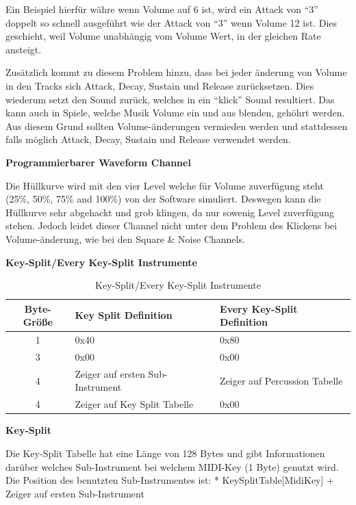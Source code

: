 \documentclass[11pt,a4paper]{scrartcl}
\newcommand{\paratitle}[1] {
    \vspace{5mm}
    \large \textbf{#1} \normalsize
    \vspace{2mm}\newline
}
\begin{document}
Ein Beispiel hierf\"ur w\"ahre wenn Volume auf 6 ist, wird ein Attack von \enquote{3} doppelt so schnell ausgef\"uhrt wie der Attack von \enquote{3} wenn Volume 12 ist. Dies geschieht, weil Volume unabh\"angig vom Volume Wert, in der gleichen Rate ansteigt.

Zus\"atzlich kommt zu diesem Problem hinzu, dass bei jeder \"anderung von Volume in den Tracks sich Attack, Decay, Sustain und Release zur\"ucksetzen. Dies wiederum setzt den Sound zur\"uck, welches in ein \enquote{klick} Sound resultiert. Das kann auch in Spiele, welche Musik Volume ein und aus blenden, geh\"ohrt werden. Aus diesem Grund sollten Volume-\"anderungen vermieden werden und stattdessen falls m\"oglich Attack, Decay, Sustain und Release verwendet werden.

\paratitle{Programmierbarer Waveform Channel}
Die H\"ullkurve wird mit den vier Level welche f\"ur Volume zuverf\"ugung steht (25\%, 50\%, 75\% and 100\%) von der Software simuliert. Deswegen kann die H\"ullkurve sehr abgehackt und grob klingen, da nur sowenig Level zuverf\"ugung stehen. Jedoch leidet dieser Channel nicht unter dem Problem des Klickens bei Volume-\"anderung, wie bei den Square \& Noise Channels.



\newpage
\paratitle{Key-Split/Every Key-Split Instrumente}

\begin{table}[h]
    \centering
    \begin{tabular}{ c | p{} | p{}}
        \textbf{Byte-Gr\"o{\ss}e} & \textbf{Key Split Definition} & \textbf{Every Key-Split Definition}\\
        \hline
        1 & 0x40 & 0x80\\
				\hline
        3 & 0x00 & 0x00\\
				\hline
        4 & Zeiger auf ersten Sub-Instrument & Zeiger auf Percussion Tabelle \\
				\hline
        4 & Zeiger auf Key Split Tabelle & 0x00\\
    \end{tabular}
    \caption{Key-Split/Every Key-Split Instrumente}
    \label{table:EveryKey-SplitInstrument}
\end{table}


\paratitle{Key-Split}
Die Key-Split Tabelle hat eine L\"ange von 128 Bytes und gibt Informationen dar\"uber welches Sub-Instrument bei welchem MIDI-Key (1 Byte) genutzt wird. 
Die Position des benutzten Sub-Instrumentes ist: * KeySplitTable[MidiKey] + Zeiger auf ersten Sub-Instrument
\end{document}
